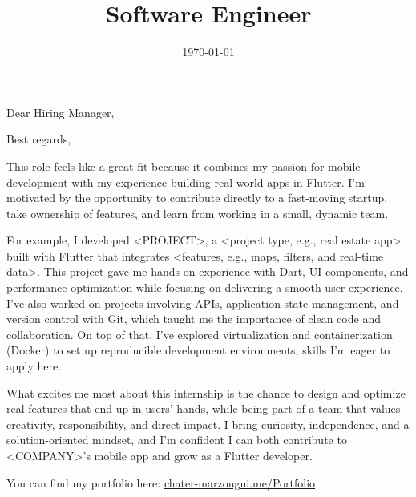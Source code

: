 \documentclass[11pt,a4paper,sans]{moderncv}
\title{Software Engineer} %
\begin{document}
\date{\today}
\opening{Dear Hiring Manager,}
\closing{Best regards,}
\makelettertitle

This role feels like a great fit because it combines my passion for mobile development with my experience building real-world apps in Flutter. I’m motivated by the opportunity to contribute directly to a fast-moving startup, take ownership of features, and learn from working in a small, dynamic team.

For example, I developed <PROJECT>, a <project type, e.g., real estate app> built with Flutter that integrates <features, e.g., maps, filters, and real-time data>. This project gave me hands-on experience with Dart, UI components, and performance optimization while focusing on delivering a smooth user experience. I’ve also worked on projects involving APIs, application state management, and version control with Git, which taught me the importance of clean code and collaboration. On top of that, I’ve explored virtualization and containerization (Docker) to set up reproducible development environments, skills I’m eager to apply here.

What excites me most about this internship is the chance to design and optimize real features that end up in users’ hands, while being part of a team that values creativity, responsibility, and direct impact. I bring curiosity, independence, and a solution-oriented mindset, and I’m confident I can both contribute to <COMPANY>'s mobile app and grow as a Flutter developer.

You can find my portfolio here: \href{https://chater-marzougui.me/Portfolio}{chater-marzougui.me/Portfolio}

\makeletterclosing
\end{document}
